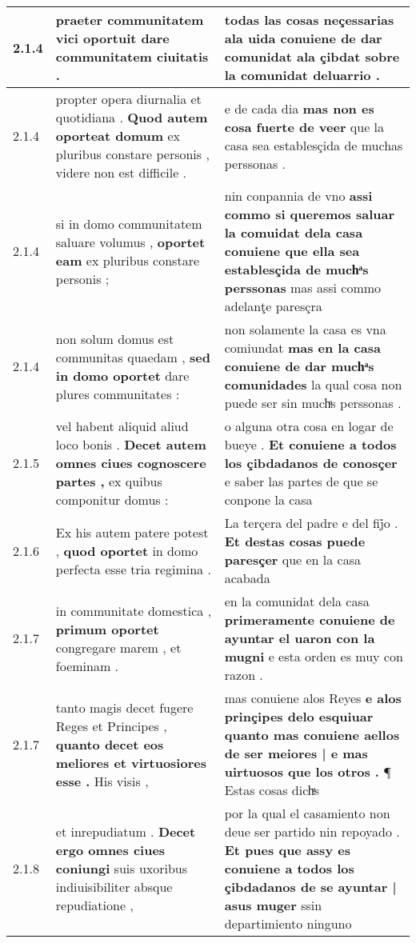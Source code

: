 \begin{tabular}{|p{1cm}|p{6.5cm}|p{6.5cm}|}
2.1.4 & praeter communitatem vici \textbf{ oportuit } dare communitatem ciuitatis . & todas las cosas neçessarias ala uida \textbf{ conuiene de dar comunidat ala çibdat } sobre la comunidat deluarrio . \\\hline
2.1.4 & propter opera diurnalia et quotidiana . \textbf{ Quod autem oporteat domum } ex pluribus constare personis , videre non est difficile . & e de cada dia \textbf{ mas non es cosa fuerte de veer } que la casa sea establesçida de muchas perssonas . \\\hline
2.1.4 & si in domo communitatem saluare volumus , \textbf{ oportet eam } ex pluribus constare personis ; & nin conpannia de vno \textbf{ assi commo si queremos saluar la comuidat dela casa conuiene que ella sea establesçida de muchͣs perssonas } mas assi commo adelanţe paresçra \\\hline
2.1.4 & non solum domus est communitas quaedam , \textbf{ sed in domo oportet } dare plures communitates : & non solamente la casa es vna comiundat \textbf{ mas en la casa conuiene de dar muchͣs comunidades } la qual cosa non puede ser sin muchͣs perssonas . \\\hline
2.1.5 & vel habent aliquid aliud loco bonis . \textbf{ Decet autem omnes ciues cognoscere partes , } ex quibus componitur domus : & o alguna otra cosa en logar de bueye . \textbf{ Et conuiene a todos los çibdadanos de conosçer } e saber las partes de que se conpone la casa \\\hline
2.1.6 & Ex his autem patere potest , \textbf{ quod oportet } in domo perfecta esse tria regimina . & La terçera del padre e del fij̉o . \textbf{ Et destas cosas puede paresçer } que en la casa acabada \\\hline
2.1.7 & in communitate domestica , \textbf{ primum oportet } congregare marem , et foeminam . & en la comunidat dela casa \textbf{ primeramente conuiene de ayuntar el uaron con la mugni } e esta orden es muy con razon . \\\hline
2.1.7 & tanto magis decet fugere Reges et Principes , \textbf{ quanto decet eos meliores et virtuosiores esse . } His visis , & mas conuiene alos Reyes \textbf{ e alos prinçipes delo esquiuar quanto mas conuiene aellos de ser meiores | e mas uirtuosos que los otros . } ¶ Estas cosas dichͣs \\\hline
2.1.8 & et inrepudiatum . \textbf{ Decet ergo omnes ciues coniungi } suis uxoribus indiuisibiliter absque repudiatione , & por la qual el casamiento non deue ser partido nin repoyado . \textbf{ Et pues que assy es conuiene a todos los çibdadanos de se ayuntar | asus muger } ssin departimiento ninguno \\\hline

\end{tabular}
